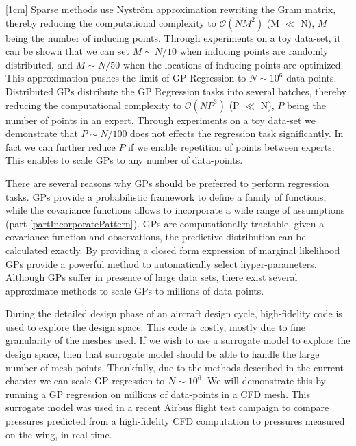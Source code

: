 [1cm]
Sparse methods use Nystr\"{o}m approximation rewriting the Gram matrix, thereby reducing the computational complexity to $\mathcal{O}(NM^{2})$ (M $\ll$ N), $M$ being the number of inducing points. Through experiments on a toy data-set, it can be shown that we can set $M \sim N/10$ when inducing points are randomly distributed, and $M \sim N/50$ when the locations of inducing points are optimized. This approximation pushes the limit of GP Regression to $N \sim 10^6$ data points. Distributed GPs distribute the GP Regression tasks into several batches, thereby reducing the computational complexity to $\mathcal{O}(NP^{3})$ (P $\ll$ N), $P$ being the number of points in an expert. Through experiments on a toy data-set we demonstrate that $P \sim N/100$ does not effects the regression task significantly. In fact we can further reduce $P$ if we enable repetition of points between experts. This enables to scale GPs to any number of data-points.

There are several reasons why GPs should be preferred to perform regression tasks. GPs provide a probabilistic framework to define a family of functions, while the covariance functions allows to incorporate a wide range of assumptions (part \ref{partIncorporatePattern}). GPs are computationally tractable, given a covariance function and observations, the predictive distribution can be calculated exactly. By providing a closed form expression of marginal likelihood GPs provide a powerful method to automatically select hyper-parameters. Although GPs suffer in presence of large data sets, there exist several approximate methods to scale GPs to millions of data points. 

During the detailed design phase of an aircraft design cycle, high-fidelity code is used to explore the design space. This code is costly, mostly due to fine granularity of the meshes used. If we wish to use a surrogate model to explore the design space, then that surrogate model should be able to handle the large number of mesh points. Thankfully, due to the methods described in the current chapter we can scale GP regression to $N \sim 10^6$. We will demonstrate this by running a GP regression on millions of data-points in a CFD mesh. This surrogate model was used in a recent Airbus flight test campaign to compare pressures predicted from a high-fidelity CFD computation to pressures measured on the wing, in real time.

